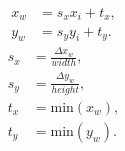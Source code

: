 \documentclass[12pt]{article}
\begin{document}
 
\begin{eqnarray} x_w &= s_x x_i + t_x,\\ y_w &= s_y y_i + t_y. \end{eqnarray}
\begin{eqnarray} s_x &= \frac{\Delta x_w}{width},\\ s_y &= \frac{\Delta y_w}{height},\\ t_x &= \text{min}(x_w),\\ t_y &= \text{min}(y_w). \end{eqnarray}
\end{document}
